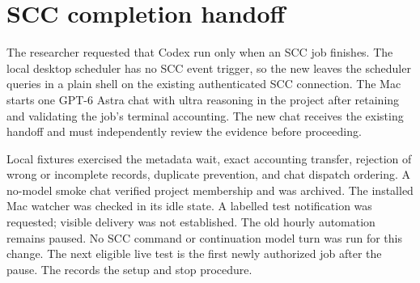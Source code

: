 \section{SCC completion handoff}

The researcher requested that Codex run only when an SCC job finishes.
The local desktop scheduler has no SCC event trigger, so the new
 leaves the scheduler queries in a
plain shell on the existing authenticated SCC connection. The Mac starts
one GPT-6 Astra chat with ultra reasoning in the project after retaining and
validating the job's terminal accounting. The new chat receives the existing
handoff and must independently review the evidence before proceeding.

Local fixtures exercised the metadata wait, exact accounting transfer,
rejection of wrong or incomplete records, duplicate prevention, and chat
dispatch ordering. A no-model smoke chat verified project membership and was
archived. The installed Mac watcher was checked in its idle state. A labelled
test notification was requested; visible delivery was not established.
The old hourly automation remains paused. No SCC command or continuation
model turn was run for this change. The next eligible live test is the first
newly authorized job after the pause. The
 records the setup and stop procedure.
